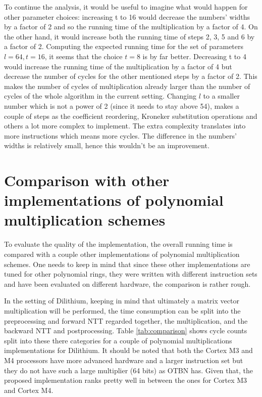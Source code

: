 To continue the analysis, it would be useful to imagine what would happen for other parameter choices: increasing t to 16 would decrease the numbers' widths by a factor of 2 and so the running time of the multiplication by a factor of 4. On the other hand, it would increase both the running time of steps 2, 3, 5 and 6 by a factor of 2. Computing the expected running time for the set of parameters $l=64, t=16$, it seems that the choice $t=8$ is by far better. Decreasing t to 4 would increase the running time of the multiplication by a factor of 4 but decrease the number of cycles for the other mentioned steps by a factor of 2. This makes the number of cycles of multiplication already larger than the number of cycles of the whole algorithm in the current setting. Changing $l$ to a smaller number which is not a power of 2 (since it needs to stay above 54), makes a couple of steps as the coefficient reordering, Kroneker substitution operations and others a lot more complex to implement. The extra complexity translates into more instructions which means more cycles. The difference in the numbers' widths is relatively small, hence this wouldn't be an improvement.

\section{Comparison with other implementations of polynomial multiplication schemes}

To evaluate the quality of the implementation, the overall running time is compared with a couple other implementations of polynomial multiplication schemes. One needs to keep in mind that since these other implementations are tuned for other polynomial rings, they were written with different instruction sets and have been evaluated on different hardware, the comparison is rather rough.

In the setting of Dilithium, keeping in mind that ultimately a matrix vector multiplication will be performed, the time consumption can be split into the preprocessing and forward NTT regarded together, the multiplication, and the backward NTT and postprocessing. Table \ref*{tab:comparison} shows cycle counts split into these there categories for a couple of polynomial multiplications implementations for Dilithium. It should be noted that both the Cortex M3 and M4 processors have more advanced hardware and a larger instruction set but they do not have such a large multiplier (64 bits) as OTBN has. Given that, the proposed implementation ranks pretty well in between the ones for Cortex M3 and Cortex M4.

